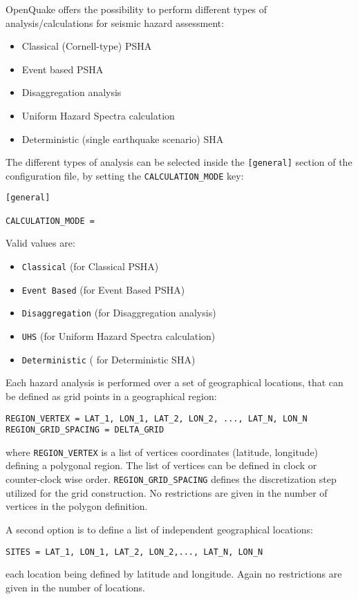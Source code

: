 OpenQuake offers the possibility to perform different types of analysis/calculations for seismic hazard assessment:
\begin{itemize}
\item Classical (Cornell-type) PSHA
\item Event based PSHA
\item Disaggregation analysis
\item Uniform Hazard Spectra calculation
\item Deterministic (single earthquake scenario) SHA
\end{itemize}

The different types of analysis can be selected inside the \Verb+[general]+ section of the configuration file, by setting  the \Verb+CALCULATION_MODE+ key:
\begin{Verbatim}[frame=single]
[general]

CALCULATION_MODE =
\end{Verbatim}

Valid values are: 
\begin{itemize}
\item \Verb+Classical+ (for Classical PSHA)
\item \Verb+Event Based+ (for Event Based PSHA)
\item \Verb+Disaggregation+ (for Disaggregation analysis)
\item \Verb+UHS+ (for Uniform Hazard Spectra calculation)
\item \Verb+Deterministic+ ( for Deterministic SHA)
\end{itemize}

Each hazard analysis is performed over a set of geographical locations, that can be defined as grid points in a geographical region:

\begin{Verbatim}[frame=single]
REGION_VERTEX = LAT_1, LON_1, LAT_2, LON_2, ..., LAT_N, LON_N
REGION_GRID_SPACING = DELTA_GRID
\end{Verbatim}

where \Verb+REGION_VERTEX+ is a list of vertices coordinates (latitude, longitude) defining a polygonal region. The list of vertices can be defined in clock or counter-clock wise order. \Verb+REGION_GRID_SPACING+ defines the discretization step utilized for the grid construction. No restrictions are given in the number of vertices in the polygon definition.

A second option is to define a list of independent geographical locations:
\begin{Verbatim}[frame=single]
SITES = LAT_1, LON_1, LAT_2, LON_2,..., LAT_N, LON_N
\end{Verbatim}
each location being defined by latitude and longitude. Again no restrictions are given in the number of locations.

